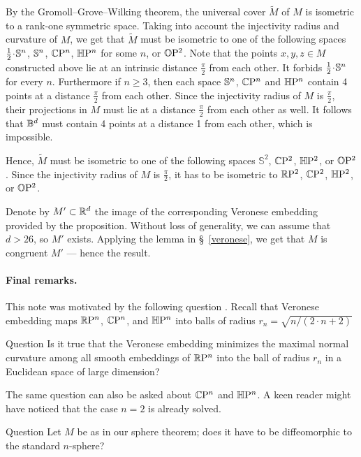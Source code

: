 \documentclass[a4paper,10pt]{article}
\begin{document}
By the Gromoll--Grove--Wilking theorem, the universal cover $\tilde M$ of $M$ is isometric to a rank-one symmetric space.
Taking into account the injectivity radius and curvature of $M$, we get that $\tilde M$ must be isometric to one of the following spaces
$\tfrac12\cdot \SSS^n$, $\mathbb{S}^n$, $\mathbb{C}\mathrm{P}^n$, $\mathbb{H}\mathrm{P}^n$ for some $n$, or $\mathbb{O}\mathrm{P}^2$.
Note that the points $x,y,z\in M$ constructed above lie at an intrinsic distance $\tfrac\pi2$ from each other.
It forbids $\tfrac12\cdot \SSS^n$ for every $n$.
Furthermore if $n\ge 3$, then each space  $\mathbb{S}^n$, $\mathbb{C}\mathrm{P}^n$ and $\mathbb{H}\mathrm{P}^n$ contain 4 points at a distance $\tfrac\pi2$ from each other.
Since the injectivity radius of $M$ is $\tfrac\pi2$, their projections in $M$ must lie at a distance $\tfrac\pi2$ from each other as well.
It follows that $\mathbb{B}^d$ must contain 4 points at a distance 1 from each other, which is impossible.

Hence, $\tilde M$ must be isometric to one of the following spaces $\mathbb{S}^2$, $\mathbb{C}\mathrm{P}^2$, $\mathbb{H}\mathrm{P}^2$, or $\mathbb{O}\mathrm{P}^2$.
Since the injectivity radius of $M$ is $\tfrac\pi2$, 
it has to be isometric to $\mathbb{R}\mathrm{P}^2$, $\mathbb{C}\mathrm{P}^2$, $\mathbb{H}\mathrm{P}^2$, or $\mathbb{O}\mathrm{P}^2$.

Denote by $M'\subset \mathbb{R}^d$ the image of the corresponding Veronese embedding provided by the proposition.
Without loss of generality, we can assume that $d>26$, so $M'$ exists.
Applying the lemma in §~\ref{veronese}, we get that $M$ is congruent $M'$ --- hence the result. 
\qeds

\paragraph{Final remarks.}
This note was motivated by the following question \cite{petrunin2023}.
Recall that Veronese embedding maps $\mathbb{R}\mathrm{P}^n$, $\mathbb{C}\mathrm{P}^n$, and $\mathbb{H}\mathrm{P}^n$ into balls of radius $r_n= \sqrt{n/(2\cdot n+2)}$

\begin{thm}{Question}
Is it true that the Veronese embedding minimizes the maximal normal curvature among all smooth embeddings of $\mathbb{R}\mathrm{P}^n$ into the ball of radius $r_n$ in a Euclidean space of large dimension?
\end{thm}

The same question can also be asked about $\mathbb{C}\mathrm{P}^n$ and $\mathbb{H}\mathrm{P}^n$. 
A keen reader might have noticed that the case $n=2$ is already solved.

\begin{thm}{Question}
Let $M$ be as in our sphere theorem;
does it have to be diffeomorphic to the standard $n$-sphere?
\end{thm}
\end{document}
